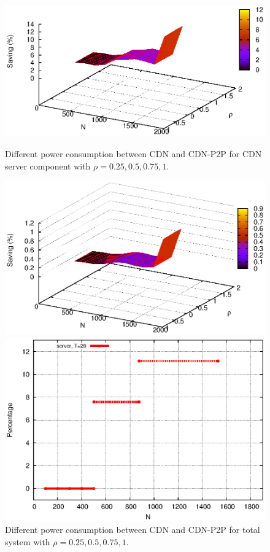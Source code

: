 \documentclass[conference]{IEEEtran}
\begin{document}
\begin{figure}[ht!]
\centering
\begin{minipage}[b]{0.4\linewidth}
	\includegraphics[scale=0.5]{graphs/diff3dimension.eps}
	\caption{Different power consumption between CDN and CDN-P2P for CDN server component with $\rho=0.25,0.5,0.75,1$.}
	\label{fig:diff1}
\end{minipage}
\hfill
\begin{minipage}[b]{0.4\linewidth}
	\includegraphics[scale=0.5]{graphs/diff3dimension2.eps}
	\caption{Different power consumption between CDN and CDN-P2P for total system with $\rho=0.25,0.5,0.75,1$.}
	\label{fig:diff2}
\end{minipage}
\centering
\begin{minipage}[b]{0.4\linewidth}
	\includegraphics[scale=0.5]{graphs/diff-3.eps}

\end{minipage}
\end{figure}
\end{document}
